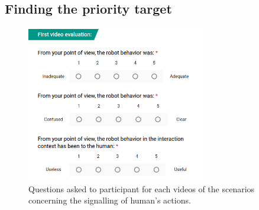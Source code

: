 \subsection{Finding the priority target}

\begin{figure}[!h]
	\centering
    \includegraphics[width=0.7\textwidth]{figs/Chapter6/QuestionsSce6.png}
    \caption{Questions asked to participant for each videos of the scenarios concerning the signalling of human's actions.}
    \label{fig:headArchi}
\end{figure}

